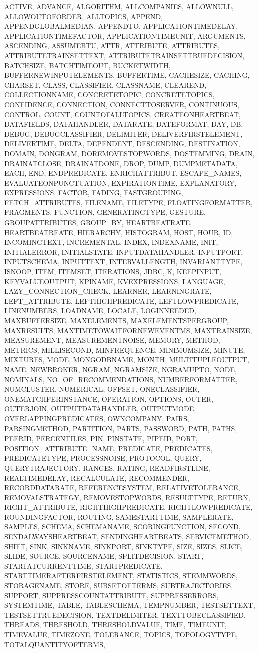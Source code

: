 {{ACTIVE, ADVANCE, ALGORITHM, ALLCOMPANIES, ALLOWNULL, ALLOWOUTOFORDER, ALLTOPICS, APPEND, APPENDGLOBALMEDIAN, APPENDTO, APPLICATIONTIMEDELAY, APPLICATIONTIMEFACTOR, APPLICATIONTIMEUNIT, ARGUMENTS, ASCENDING, ASSUMEBTU, ATTR, ATTRIBUTE, ATTRIBUTES, ATTRIBUTETRAINSETTEXT, ATTRIBUTETRAINSETTRUEDECISION, BATCHSIZE, BATCHTIMEOUT, BUCKETWIDTH, BUFFERNEWINPUTELEMENTS, BUFFERTIME, CACHESIZE, CACHING, CHARSET, CLASS, CLASSIFIER, CLASSNAME, CLEAREND, COLLECTIONNAME, CONCRETETOPIC, CONCRETETOPICS, CONFIDENCE, CONNECTION, CONNECTTOSERVER, CONTINUOUS, CONTROL, COUNT, COUNTOFALLTOPICS, CREATEONHEARTBEAT, DATAFIELDS, DATAHANDLER, DATARATE, DATEFORMAT, DAY, DB, DEBUG, DEBUGCLASSIFIER, DELIMITER, DELIVERFIRSTELEMENT, DELIVERTIME, DELTA, DEPENDENT, DESCENDING, DESTINATION, DOMAIN, DONGRAM, DOREMOVESTOPWORDS, DOSTEMMING, DRAIN, DRAINATCLOSE, DRAINATDONE, DROP, DUMP, DUMPMETADATA, EACH, END, ENDPREDICATE, ENRICHATTRIBUT, ESCAPE_NAMES, EVALUATEONPUNCTUATION, EXPIRATIONTIME, EXPLANATORY, EXPRESSIONS, FACTOR, FADING, FASTGROUPING, FETCH_ATTRIBUTES, FILENAME, FILETYPE, FLOATINGFORMATTER, FRAGMENTS, FUNCTION, GENERATINGTYPE, GESTURE, GROUPATTRIBUTES, GROUP_BY, HEARTBEATRATE, HEARTBEATREATE, HIERARCHY, HISTOGRAM, HOST, HOUR, ID, INCOMINGTEXT, INCREMENTAL, INDEX, INDEXNAME, INIT, INITIALERROR, INITIALSTATE, INPUTDATAHANDLER, INPUTPORT, INPUTSCHEMA, INPUTTEXT, INTERVALLENGTH, INVARIANTTYPE, ISNOOP, ITEM, ITEMSET, ITERATIONS, JDBC, K, KEEPINPUT, KEYVALUEOUTPUT, KPINAME, KVEXPRESSIONS, LANGUAGE, LAZY_CONNECTION_CHECK, LEARNER, LEARNINGRATE, LEFT_ATTRIBUTE, LEFTHIGHPREDICATE, LEFTLOWPREDICATE, LINENUMBERS, LOADNAME, LOCALE, LOGINNEEDED, MAXBUFFERSIZE, MAXELEMENTS, MAXELEMENTSPERGROUP, MAXRESULTS, MAXTIMETOWAITFORNEWEVENTMS, MAXTRAINSIZE, MEASUREMENT, MEASUREMENTNOISE, MEMORY, METHOD, METRICS, MILLISECOND, MINFREQUENCE, MINIMUMSIZE, MINUTE, MIXTURES, MODE, MONGODBNAME, MONTH, MULTITUPLEOUTPUT, NAME, NEWBROKER, NGRAM, NGRAMSIZE, NGRAMUPTO, NODE, NOMINALS, NO_OF_RECOMMENDATIONS, NUMBERFORMATTER, NUMCLUSTER, NUMERICAL, OFFSET, ONECLASSIFIER, ONEMATCHPERINSTANCE, OPERATION, OPTIONS, OUTER, OUTERJOIN, OUTPUTDATAHANDLER, OUTPUTMODE, OVERLAPPINGPREDICATES, OWNCOMPANY, PAIRS, PARSINGMETHOD, PARTITION, PARTS, PASSWORD, PATH, PATHS, PEERID, PERCENTILES, PIN, PINSTATE, PIPEID, PORT, POSITION_ATTRIBUTE_NAME, PREDICATE, PREDICATES, PREDICATETYPE, PROCESSNOISE, PROTOCOL, QUERY, QUERYTRAJECTORY, RANGES, RATING, READFIRSTLINE, REALTIMEDELAY, RECALCULATE, RECOMMENDER, RECORDDATARATE, REFERENCESYSTEM, RELATIVETOLERANCE, REMOVALSTRATEGY, REMOVESTOPWORDS, RESULTTYPE, RETURN, RIGHT_ATTRIBUTE, RIGHTHIGHPREDICATE, RIGHTLOWPREDICATE, ROUNDINGFACTOR, ROUTING, SAMESTARTTIME, SAMPLERATE, SAMPLES, SCHEMA, SCHEMANAME, SCORINGFUNCTION, SECOND, SENDALWAYSHEARTBEAT, SENDINGHEARTBEATS, SERVICEMETHOD, SHIFT, SINK, SINKNAME, SINKPORT, SINKTYPE, SIZE, SIZES, SLICE, SLIDE, SOURCE, SOURCENAME, SPLITDECISION, START, STARTATCURRENTTIME, STARTPREDICATE, STARTTIMERAFTERFIRSTELEMENT, STATISTICS, STEMMWORDS, STORAGENAME, STORE, SUBSETOFTERMS, SUBTRAJECTORIES, SUPPORT, SUPPRESSCOUNTATTRIBUTE, SUPPRESSERRORS, SYSTEMTIME, TABLE, TABLESCHEMA, TEMPNUMBER, TESTSETTEXT, TESTSETTRUEDECISION, TEXTDELIMITER, TEXTTOBECLASSIFIED, THREADS, THRESHOLD, THRESHOLDVALUE, TIME, TIMEUNIT, TIMEVALUE, TIMEZONE, TOLERANCE, TOPICS, TOPOLOGYTYPE, TOTALQUANTITYOFTERMS, }}
